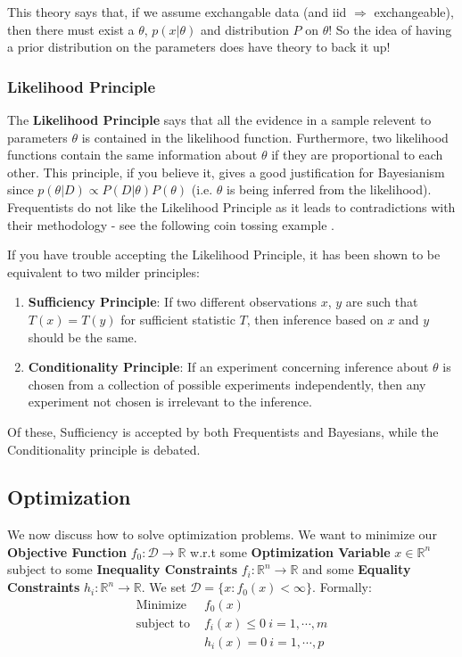 \documentclass[]{article}
\theoremstyle{mattstyle}
\theoremstyle{definition}
\begin{document}
This theory says that, if we assume exchangable data (and iid $\Rightarrow$ exchangeable), then there must exist a \(\theta\), \(p(x|\theta)\) and distribution \(P\) on \(\theta\)! So the idea of having a prior distribution on the parameters does have theory to back it up!


\subsubsection{Likelihood Principle}

The \textbf{Likelihood Principle} says that all the evidence in a sample relevent to parameters \(\theta\) is contained in the likelihood function. Furthermore, two likelihood functions contain the same information about \(\theta\) if they
are proportional to each other.\cite{slides} This principle, if you believe it, gives a good justification for Bayesianism since \(p(\theta|D) \propto P(D|\theta)P(\theta)\) (i.e. $\theta$ is being inferred from the likelihood). Frequentists do not like the Likelihood Principle as it leads to contradictions with their methodology - see the following coin tossing example \cite{MJordanNotes}.

If you have trouble accepting the Likelihood Principle, it has been shown to be equivalent to two milder principles:
\begin{enumerate}
	\item \textbf{Sufficiency Principle}: If two different observations $x$, $y$ are such that $T(x) = T(y)$ for sufficient statistic $T$, then inference based on $x$ and $y$ should be the same.
	\item \textbf{Conditionality Principle}: If an experiment concerning inference about $\theta$ is chosen from a collection of
	possible experiments independently, then any experiment not chosen is irrelevant to the inference.
\end{enumerate}

Of these, Sufficiency is accepted by both Frequentists and Bayesians, while the Conditionality principle is debated.

\newpage
\subsection{Optimization}\label{sec:optim}

We now discuss how to solve optimization problems. We want to minimize our \textbf{Objective Function} $f_0 : \mathcal{D} \rightarrow \mathbb{R}$ w.r.t some  \textbf{Optimization Variable} $x \in \mathbb{R}^n$ subject to some \textbf{Inequality Constraints} $f_i: \mathbb{R}^n \rightarrow \mathbb{R}$ and some \textbf{Equality Constraints} $h_i: \mathbb{R}^n \rightarrow \mathbb{R}$.
We set $\mathcal{D} = \{x : f_0(x) < \infty\}$.
Formally:
\begin{align*}
\text{Minimize } & f_0(x) \\
\text{subject to } & f_i(x) \le 0 \ i = 1, \cdots, m\\
& h_i(x) = 0 \ i = 1, \cdots, p
\end{align*}
\end{document}
